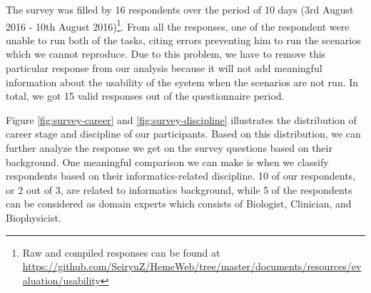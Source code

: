 \vspace{0.5cm}

\vspace{0.5cm}

\noindent%
\begin{minipage}{\linewidth}%
 \label{fig:survey-discipline}%
\end{minipage}

\vspace{0.5cm}


The survey was filled by 16 respondents over the period of 10 days (3rd August 2016 - 10th August 2016)\footnote{Raw and compiled responses can be found at \url{https://github.com/SeiryuZ/HemeWeb/tree/master/documents/resources/evaluation/usability}}. From all the responses, one of the respondent were unable to run both of the tasks, citing errors preventing him to run the scenarios which we cannot reproduce. Due to this problem, we have to remove this particular response from our analysis because it will not add meaningful information about the usability of the system when the scenarios are not run. In total, we got 15 valid responses out of the questionnaire period.

Figure \ref{fig:survey-career} and \ref{fig:survey-discipline} illustrates the distribution of career stage and discipline of our participants. Based on this distribution, we can further analyze the response we get on the survey questions based on their background. One meaningful comparison we can make is when we classify respondents based on their informatics-related discipline. 10 of our respondents, or 2 out of 3, are related to informatics background, while 5 of the respondents can be considered as domain experts which consists of Biologist, Clinician, and Biophysicist.


